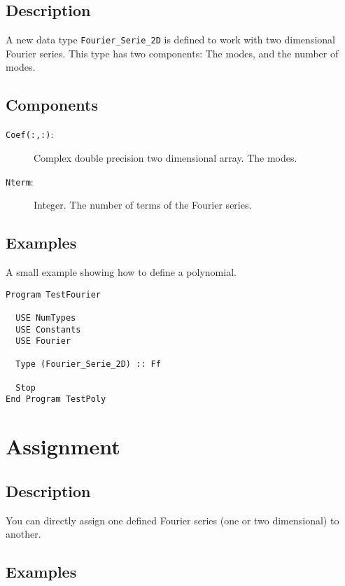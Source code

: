 \subsection{Description}

A new data type \texttt{Fourier\_Serie\_2D} is defined to work with
two dimensional Fourier series. This type has two components: The
modes, and the number of modes.

\subsection{Components}

\begin{description}
\item[\texttt{Coef(:,:)}: ] Complex double precision two dimensional
  array. The modes.
\item[\texttt{Nterm}:] Integer. The number of terms of the Fourier
  series. 
\end{description}

\subsection{Examples}

A small example showing how to define a polynomial.

\begin{lstlisting}[emph=Type,
                   emphstyle=\color{blue},
                   frame=trBL,
                   caption=Defining a two-dimensional Fourier serie.,
                   label=typef2]
Program TestFourier

  USE NumTypes
  USE Constants
  USE Fourier

  Type (Fourier_Serie_2D) :: Ff

  Stop
End Program TestPoly
\end{lstlisting}


\section{Assignment}

\subsection{Description}

You can directly assign one defined Fourier series (one or two
dimensional) to another.

\subsection{Examples}

